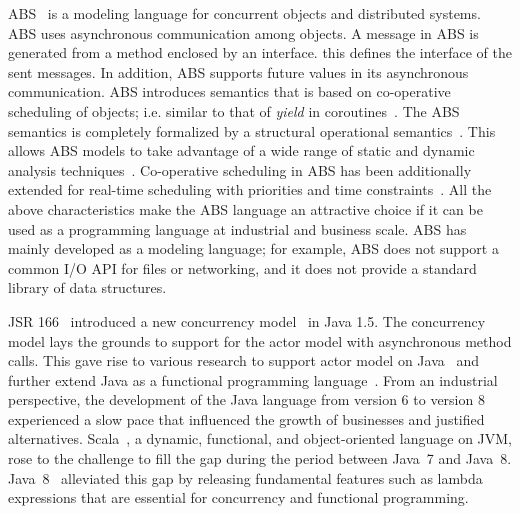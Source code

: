 ABS~\cite{johnsen2012abs,hahnlehjlssw11} is a modeling language for concurrent objects and distributed systems.
ABS uses asynchronous communication among objects.
A message in ABS is generated from a method enclosed by an interface.
this defines the interface of the sent messages.
In addition, ABS supports future values in its asynchronous communication.
ABS introduces  semantics that is based on co-operative scheduling of objects; 
i.e. similar to that of \emph{yield} in coroutines~\cite{creol:broch:owe}.
The ABS semantics is completely formalized by a structural operational semantics~\cite{plotkin:sos,abs:2012}.
This allows ABS models to take advantage of a wide range of static and dynamic analysis techniques~\cite{DBLP:journals/sttt/WongBBGGHMS15,DBLP:conf/cade/DinBH15,DBLP:conf/ifm/GiachinoGLLW13,DBLP:conf/tacas/AlbertAFGGMPR14}.
% 
Co-operative scheduling in ABS has been additionally extended for real-time scheduling with priorities and time constraints~\cite{bjork2013:rtabs,johnsen2012modeling}.
All the above characteristics make the ABS language an attractive choice if it
can be used as a programming language at industrial and business scale.
ABS has mainly developed as a modeling language;
for example, ABS does not support a common I/O API for files or networking,
and it does not provide a standard library of data structures.

JSR 166~\cite{jsr166} introduced a new concurrency model~\cite{DBLP:conf/java/Lea00} in Java 1.5.
The concurrency model lays the grounds to support for the actor model with asynchronous method calls.
This gave rise to various research to support actor model on Java~\cite{actor_frameworks_jvm:agha} and further extend Java as a functional programming language~\cite{odersky1997pizza,henkel2003discovering,nystrom2003polyglot,bracha1998making}.
From an industrial perspective, the development of the Java language from version 6 to version 8 experienced a slow pace that influenced the growth of businesses and justified alternatives.
Scala~\cite{odersky2004scala}, a dynamic, functional, and object-oriented language on JVM, rose to the challenge to fill the gap during the period between Java~7 and Java~8.
Java~8~\cite{jls8} alleviated this gap by releasing fundamental features such as lambda expressions that are essential for concurrency and functional programming.

